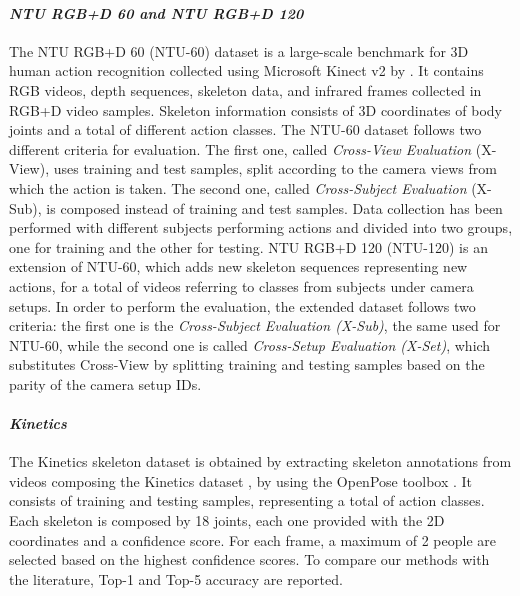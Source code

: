 \documentclass[review]{cvpr}
\begin{document}
\paragraph*{\textbf{\textit{NTU RGB+D 60 and NTU RGB+D 120}}}{The NTU RGB+D 60 (NTU-60) dataset is a large-scale benchmark for 3D human action recognition collected using Microsoft Kinect v2 by \cite{ntu}. It contains RGB videos, depth sequences, skeleton data, and infrared frames collected in  RGB+D video samples. Skeleton information consists of 3D coordinates of  body joints and a total of  different action classes. The NTU-60 dataset follows two different criteria for evaluation. The first one, called \textit{Cross-View Evaluation} (X-View), uses  training and  test samples, split according to the camera views from which the action is taken. The second one, called \textit{Cross-Subject Evaluation} (X-Sub), is composed instead of  training and  test samples. Data collection has been performed with  different subjects performing actions and divided into two groups, one for training and the other for testing. NTU RGB+D 120 \cite{ntu120} (NTU-120) is an extension of NTU-60, which adds  new skeleton sequences representing  new actions, for a total of  videos referring to  classes from  subjects under  camera setups. In order to perform the evaluation, the extended dataset follows two criteria: the first one is the \textit{Cross-Subject Evaluation (X-Sub)}, the same used for NTU-60, while the second one is called \textit{Cross-Setup Evaluation (X-Set)}, which substitutes Cross-View by splitting training and testing samples based on the parity of the camera setup IDs.  } 

\paragraph*{\textbf{\textit{Kinetics}}} The Kinetics skeleton dataset \cite{yan2018spatial} is obtained by extracting skeleton annotations from videos composing the Kinetics  dataset \cite{Kin}, by using the OpenPose toolbox \cite{openpose}. It consists of  training and  testing samples, representing a total of  action classes. Each skeleton is composed by 18 joints, each one provided with the 2D coordinates and a confidence score. For each frame, a maximum of 2 people are selected based on the highest confidence scores. To compare our methods with the literature, Top-1 and Top-5 accuracy are reported.
\end{document}
